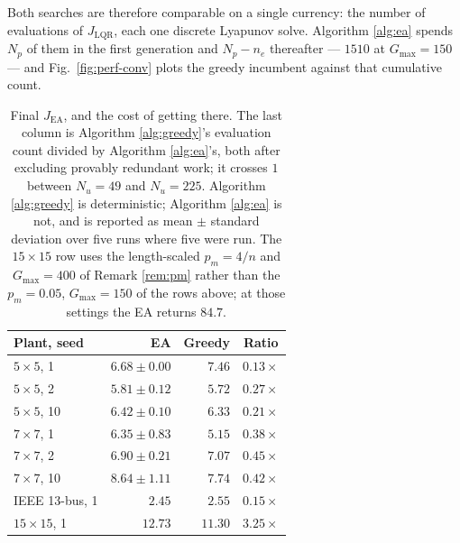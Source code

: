 Both searches are therefore comparable on a single currency: the number of
evaluations of $J_\mathrm{LQR}$, each one discrete Lyapunov solve. Algorithm
\ref{alg:ea} spends $N_p$ of them in the first generation and $N_p - n_e$
thereafter --- $1510$ at $G_{\max} = 150$ --- and Fig.~\ref{fig:perf-conv} plots
the greedy incumbent against that cumulative count.

\begin{table}[t]
\centering
\caption{Final $J_\mathrm{EA}$, and the cost of getting there. The last column
is Algorithm \ref{alg:greedy}'s evaluation count divided by Algorithm
\ref{alg:ea}'s, both after excluding provably redundant work; it crosses $1$
between $N_u = 49$ and $N_u = 225$. Algorithm \ref{alg:greedy} is
deterministic; Algorithm \ref{alg:ea} is not, and is reported as mean $\pm$
standard deviation over five runs where five were run. The $15\times15$ row uses
the length-scaled $p_m = 4/n$ and $G_{\max} = 400$ of Remark \ref{rem:pm}
rather than the $p_m = 0.05$, $G_{\max} = 150$ of the rows above; at those
settings the EA returns $84.7$.}
\label{tab:greedy}
\begin{tabular}{lrrc}
\toprule
Plant, seed & EA & Greedy & Ratio \\
\midrule
$5\!\times\!5$, 1   & $\mathbf{6.68 \pm 0.00}$ & $7.46$ & $0.13\times$ \\
$5\!\times\!5$, 2   & $5.81 \pm 0.12$ & $\mathbf{5.72}$ & $0.27\times$ \\
$5\!\times\!5$, 10  & $6.42 \pm 0.10$ & $\mathbf{6.33}$ & $0.21\times$ \\
$7\!\times\!7$, 1   & $6.35 \pm 0.83$ & $\mathbf{5.15}$ & $0.38\times$ \\
$7\!\times\!7$, 2   & $\mathbf{6.90 \pm 0.21}$ & $7.07$ & $0.45\times$ \\
$7\!\times\!7$, 10  & $8.64 \pm 1.11$ & $\mathbf{7.74}$ & $0.42\times$ \\
IEEE 13-bus, 1      & $\mathbf{2.45}$ & $2.55$ & $0.15\times$ \\
\midrule
$15\!\times\!15$, 1 & $12.73$ & $\mathbf{11.30}$ & $\mathbf{3.25\times}$ \\
\bottomrule
\end{tabular}
\end{table}

